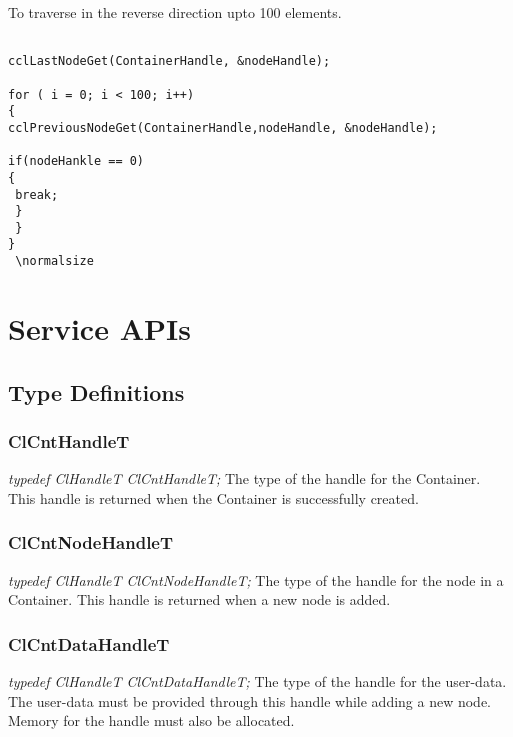  To traverse in the reverse direction upto 100 elements.
 \footnotesize\begin{verbatim}

cclLastNodeGet(ContainerHandle, &nodeHandle);

for ( i = 0; i < 100; i++)
{
cclPreviousNodeGet(ContainerHandle,nodeHandle, &nodeHandle);   

if(nodeHankle == 0)
{
 break;
 }
 }
}
 \normalsize\end{verbatim}










\chapter{Service APIs}


\section{Type Definitions}

\subsection{ClCntHandleT}
\textit{typedef ClHandleT ClCntHandleT;}
\newline
\newline
The type of the handle for the Container. This handle is returned when the Container is successfully created.

\subsection{ClCntNodeHandleT}
\textit{typedef ClHandleT ClCntNodeHandleT;}
\newline
\newline
The type of the handle for the node in a Container. This handle is returned when a new node is added. 


\subsection{ClCntDataHandleT}
\textit{typedef ClHandleT ClCntDataHandleT;}
\newline
\newline
The type of the handle for the user-data. The user-data must be provided through this handle while adding a new node.
Memory for the handle must also be allocated.


